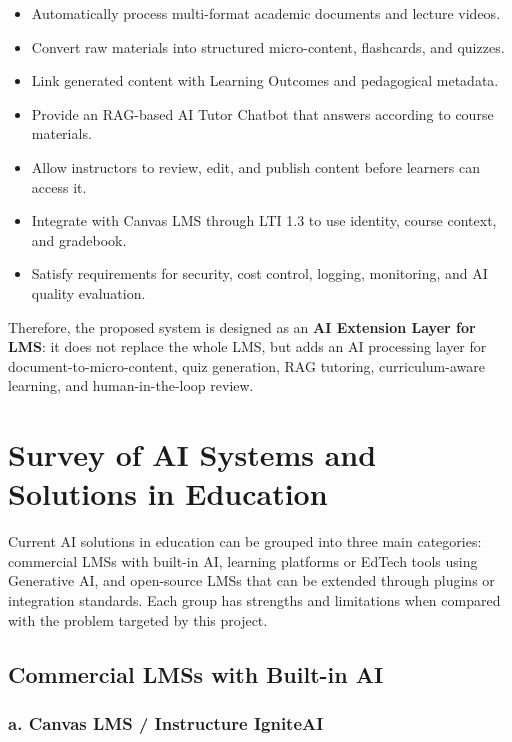 \begin{itemize}
    \item Automatically process multi-format academic documents and lecture
          videos.
    \item Convert raw materials into structured micro-content, flashcards, and
          quizzes.
    \item Link generated content with Learning Outcomes and pedagogical
          metadata.
    \item Provide an RAG-based AI Tutor Chatbot that answers according to
          course materials.
    \item Allow instructors to review, edit, and publish content before
          learners can access it.
    \item Integrate with Canvas LMS through LTI 1.3 to use identity, course
          context, and gradebook.
    \item Satisfy requirements for security, cost control, logging, monitoring,
          and AI quality evaluation.
\end{itemize}

Therefore, the proposed system is designed as an \textbf{AI Extension Layer for
LMS}: it does not replace the whole LMS, but adds an AI processing layer for
document-to-micro-content, quiz generation, RAG tutoring, curriculum-aware
learning, and human-in-the-loop review.

\section{Survey of AI Systems and Solutions in Education}
\label{sec:khao-sat-giai-phap-ai-giao-duc}

Current AI solutions in education can be grouped into three main categories:
commercial LMSs with built-in AI, learning platforms or EdTech tools using
Generative AI, and open-source LMSs that can be extended through plugins or
integration standards. Each group has strengths and limitations when compared
with the problem targeted by this project.

\subsection{Commercial LMSs with Built-in AI}

\subsubsection*{a. Canvas LMS / Instructure IgniteAI}

